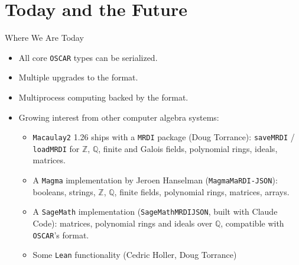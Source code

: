\documentclass[9pt]{beamer}
\newcommand{\OSCAR}{\texttt{OSCAR}\xspace}
\begin{document}

\section{Today and the Future}

\begin{frame}[fragile]{Where We Are Today}
  \begin{itemize}
  \item All core \OSCAR types can be serialized. \pause
  \item Multiple upgrades to the format. \pause
  \item Multiprocess computing backed by the format. \pause
  \item Growing interest from other computer algebra systems: \pause
    \begin{itemize}
    \item \texttt{Macaulay2} 1.26 ships with a \texttt{MRDI} package
      (Doug Torrance): \texttt{saveMRDI} / \texttt{loadMRDI} for $\mathbb{Z}$,
      $\mathbb{Q}$, finite and Galois fields, polynomial rings, ideals,
      matrices. \pause
    \item A \texttt{Magma} implementation by Jeroen Hanselman
      (\texttt{MagmaMaRDI-JSON}): booleans, strings, $\mathbb{Z}$, $\mathbb{Q}$,
      finite fields, polynomial rings, matrices, arrays. \pause
    \item A \texttt{SageMath} implementation (\texttt{SageMathMRDIJSON}, built
      with Claude Code): matrices, polynomial rings and ideals over $\mathbb{Q}$,
      compatible with \OSCAR's format.
    \item Some \texttt{Lean} functionality (Cedric Holler, Doug Torrance)
    \end{itemize}
  \end{itemize}
\end{frame}

\end{document}
